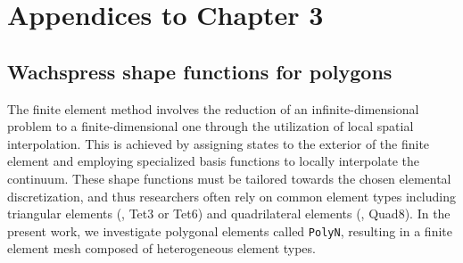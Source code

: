 \chapter{Appendices to Chapter 3}
\vspace{-10mm}
\section{Wachspress shape functions for polygons}
\label{app:C3:wachpress}
The finite element method involves the reduction of an infinite-dimensional problem to a finite-dimensional one through the utilization of local spatial interpolation. This is achieved by assigning states to the exterior of the finite element and employing specialized basis functions to locally interpolate the continuum. These shape functions must be tailored towards the chosen elemental discretization, and thus researchers often rely on common element types including triangular elements (\eg, Tet3 or Tet6) and quadrilateral elements (\eg, Quad8). In the present work, we investigate polygonal elements called \texttt{PolyN}, resulting in a finite element mesh composed of heterogeneous element types.


